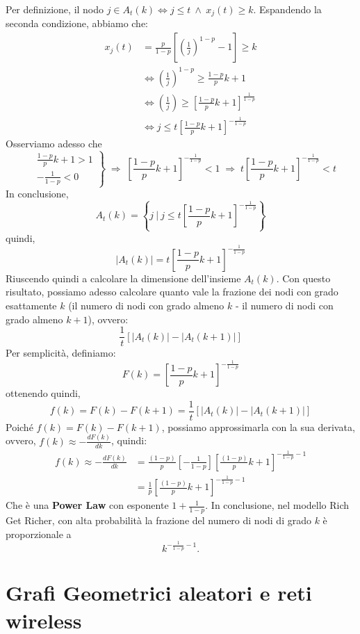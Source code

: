  Per definizione, il nodo $j \in A_t(k) \iff j \leq t\ \land\ x_j(t) \geq k$. Espandendo la seconda condizione, abbiamo che:
\begin{align*}
x_j(t) &= \frac{p}{1-p}\left[\left( \frac{1}{j}\right)^{1-p} - 1\right] \geq k \\
&\iff \left( \frac{1}{j}\right)^{1-p} \geq \frac{1-p}{p}k + 1 \\
&\iff \left( \frac{1}{j}\right) \geq \left[\frac{1-p}{p}k + 1\right]^{\frac{1}{1-p}} \\
&\iff j \leq t\left[\frac{1-p}{p}k + 1\right]^{-\frac{1}{1-p}}
\end{align*}
Osserviamo adesso che 
\[
\left.
\begin{aligned}
& \frac{1-p}{p}k + 1 > 1 \\
& -\frac{1}{1-p} < 0
\end{aligned}
\right\}
\;\Rightarrow\;
\left[\frac{1-p}{p}k + 1\right]^{-\frac{1}{1-p}} < 1
\;\Rightarrow\; t\left[\frac{1-p}{p}k + 1\right]^{-\frac{1}{1-p}} < t
\]
In conclusione, 
\[
A_t(k) = \left\{j\ |\ j \leq t\left[\frac{1-p}{p}k + 1\right]^{-\frac{1}{1-p}}\right\}
\]
quindi,
\[
|A_t(k)| = t\left[\frac{1-p}{p}k + 1\right]^{-\frac{1}{1-p}}
\]
Riuscendo quindi a calcolare la dimensione dell'insieme $A_t(k)$. Con questo risultato, possiamo adesso calcolare quanto vale la frazione dei nodi con grado esattamente $k$ (il numero di nodi con grado almeno $k$ - il numero di nodi con grado almeno $k + 1$), ovvero:
\[
\frac{1}{t}[|A_t(k)| - |A_t(k+1)|]
\]
Per semplicità, definiamo:
\[
F(k) = \left[\frac{1-p}{p}k + 1\right]^{-\frac{1}{1-p}}
\]
ottenendo quindi,
\[
f(k) = F(k) - F(k + 1) = \frac{1}{t}[|A_t(k)| - |A_t(k+1)|]
\]
Poiché $f(k) = F(k) - F(k + 1)$, possiamo approssimarla con la sua derivata, ovvero, $f(k) \approx - \frac{dF(k)}{dk}$, quindi:
\[
\begin{aligned}
f(k) \approx - \frac{dF(k)}{dk} &= \frac{(1-p)}{p}\left[-\frac{1}{1-p}\right]\left[\frac{(1-p)}{p}k+1\right]^{-\frac{1}{1-p}-1}\\
&= \frac{1}{p}\left[\frac{(1-p)}{p}k+1\right]^{-\frac{1}{1-p}-1} 
\end{aligned}
\]
Che è una \textbf{Power Law} con esponente $1 + \frac{1}{1-p}$.
In conclusione, nel modello Rich Get Richer, con alta probabilità la frazione del numero di nodi di grado $k$ è proporzionale a 
\[k^{-\frac{1}{1-p}-1}.\]

\newpage

\section{Grafi Geometrici aleatori e reti wireless}

